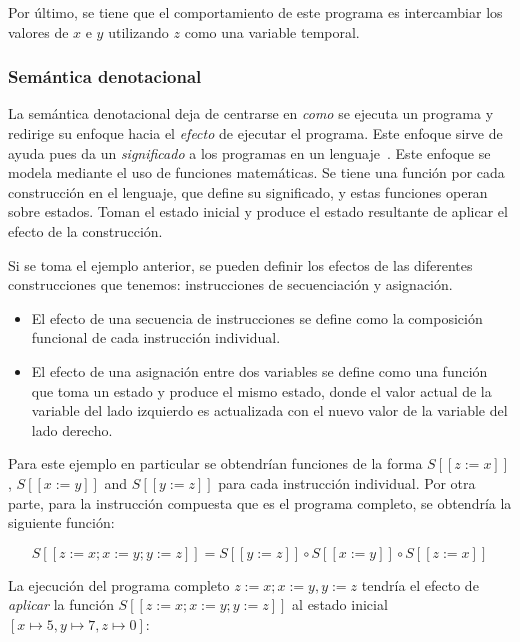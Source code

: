 Por último, se tiene que el comportamiento de este programa es intercambiar los valores de $x$ e $y$ utilizando $z$ como una variable temporal.


\subsubsection*{Semántica denotacional}
La semántica denotacional deja de centrarse en \textit{como} se ejecuta un programa y redirige su enfoque hacia el \textit{efecto} de ejecutar el programa.
Este enfoque sirve de ayuda pues da un \textit{significado} a los programas en un lenguaje~\citep{nipkow}.
Este enfoque se modela mediante el uso de funciones matemáticas.
Se tiene una función por cada construcción en el lenguaje, que define su significado, y estas funciones operan sobre estados.
Toman el estado inicial y produce el estado resultante de aplicar el efecto de la construcción.
\begin{comment}
FIXME Construcción no es la palabra.
\end{comment}

Si se toma el ejemplo anterior, se pueden definir los efectos de las diferentes construcciones que tenemos: instrucciones de secuenciación y asignación.

\begin{itemize}
\item{El efecto de una secuencia de instrucciones se define como la composición funcional de cada instrucción individual.}
\item{El efecto de una asignación entre dos variables se define como una función que toma un estado y produce el mismo estado, donde el valor actual de la variable del lado izquierdo es actualizada con el nuevo valor de la variable del lado derecho.}
\end{itemize}

Para este ejemplo en particular se obtendrían funciones de la forma $S [\![ z:=x ]\!]$, $S [\![ x:=y ]\!]$ and $S [\![ y:=z ]\!]$ para cada instrucción individual.
Por otra parte, para la instrucción compuesta que es el programa completo, se obtendría la siguiente función:

\begin{equation*}
S [\![ z:=x; x:=y; y:=z ]\!] = S [\![ y:=z ]\!] \circ S [\![ x:=y ]\!] \circ S [\![ z:=x ]\!]
\end{equation*}

La ejecución del programa completo $z:=x; x:=y, y:=z$ tendría el efecto de \textit{aplicar} la función $S [\![ z:=x; x:=y; y:=z ]\!]$ al estado inicial $[x\mapsto5, y\mapsto7, z\mapsto0]$:

